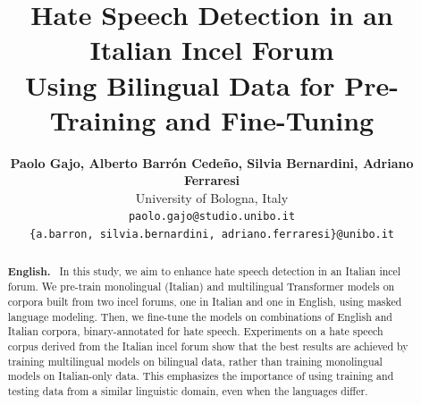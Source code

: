 \documentclass[11pt]{article}
\title{Hate Speech Detection in an Italian Incel Forum \\ Using Bilingual Data for Pre-Training and Fine-Tuning}
\author{\textbf{Paolo Gajo, Alberto Barrón Cedeño, Silvia Bernardini, Adriano Ferraresi} \\
  University of Bologna, Italy \\
  {\tt paolo.gajo@studio.unibo.it}\\
  {\tt \{a.barron, silvia.bernardini, adriano.ferraresi\}@unibo.it}}
\date{}
\begin{document}
\maketitle
\begin{abstract}
\textbf{English.}~
In this study, we aim to enhance hate speech detection in an Italian incel forum.
We pre-train monolingual (Italian) and multilingual Transformer models on corpora built from two incel forums, one in Italian and one in English, using masked language modeling. Then, we fine-tune the models on combinations of English and Italian corpora, binary-annotated for hate speech.
Experiments on a hate speech corpus derived from the Italian incel forum show that the best results are achieved by training multilingual models on bilingual data,
rather than training monolingual models on Italian-only data. This emphasizes the importance of using training and testing data from a similar linguistic domain, even when the languages differ.


\end{abstract}
\end{document}
